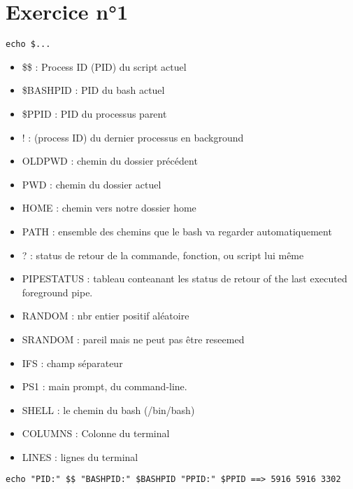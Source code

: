 \documentclass[11pt]{article}
\author{cliquot}
\date{\today}
\title{}
\begin{document}
\tableofcontents

\section{Exercice n°1}
\label{sec:orgd65a0ff}
\begin{lstlisting}
echo $...
\end{lstlisting}
\begin{itemize}
\item \$\$ : Process ID (PID) du script actuel
\item \$BASHPID : PID du bash actuel
\item \$PPID : PID du processus parent
\item ! : (process ID) du dernier processus en background
\item OLDPWD : chemin du dossier précédent
\item PWD : chemin du dossier actuel
\item HOME : chemin vers notre dossier home
\item PATH : ensemble des chemins que le bash va regarder automatiquement
\item ? : status de retour de la commande, fonction, ou script lui même
\item PIPESTATUS : tableau conteanant les status de retour of the last executed foreground pipe.
\item RANDOM : nbr entier positif aléatoire
\item SRANDOM : pareil mais ne peut pas être reseemed
\item IFS : champ séparateur
\item PS1 : main prompt, du command-line.
\item SHELL : le chemin du bash (/bin/bash)
\item COLUMNS : Colonne du terminal
\item LINES : lignes du terminal
\end{itemize}


\begin{lstlisting}
echo "PID:" $$ "BASHPID:" $BASHPID "PPID:" $PPID ==> 5916 5916 3302
\end{lstlisting}
\end{document}
